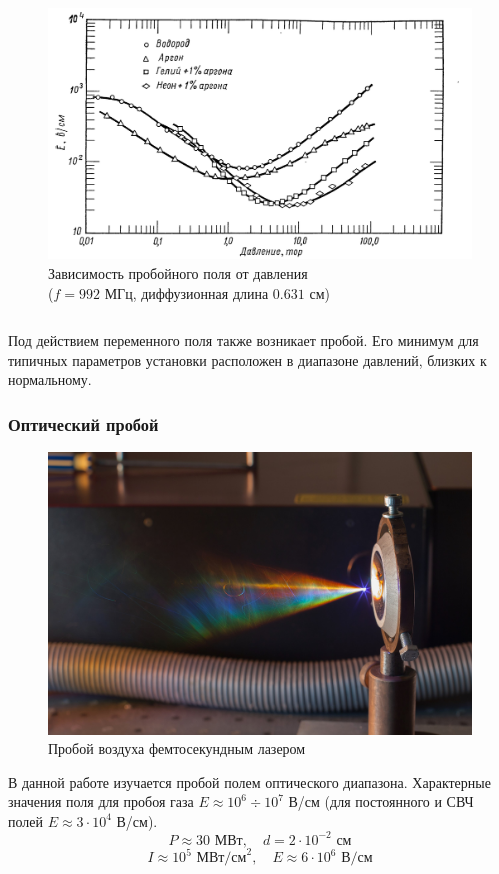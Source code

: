\documentclass{beamer}
\begin{document}
\begin{frame}
\begin{columns}
			\begin{figure}
				\centering
				\includegraphics[width=1\linewidth]{res/microwave_discharge.png}
				\caption*{Зависимость пробойного поля от давления\\ ($f = 992$ МГц, диффузионная длина $0.631$ см)}
			\end{figure}
			
		\end{columns}		
		
		Под действием переменного поля также возникает пробой. Его минимум для типичных параметров установки расположен в диапазоне давлений, близких к нормальному.
	\end{frame}

	\begin{frame}
		\frametitle{Оптический пробой}
		\begin{figure}
			\centering
			\includegraphics[width=0.6\linewidth]{res/femtosecond_laser_spark.jpg}
			\caption*{Пробой воздуха фемтосекундным лазером}
		\end{figure}
		В данной работе изучается пробой полем оптического диапазона. Характерные значения поля для пробоя газа $E \approx 10^6 \div 10^7$ В/см (для постоянного и СВЧ полей $E \approx 3 \cdot 10^4$ В/см). 
		$$ P \approx 30 \text{ МВт}, \quad d = 2 \cdot 10^{-2} \text{ см} $$
		$$ I \approx 10^5 \text{ МВт/см}^2, \quad E \approx 6 \cdot 10^6 \text{ В/см} $$

	
	\end{frame}
\end{document}
